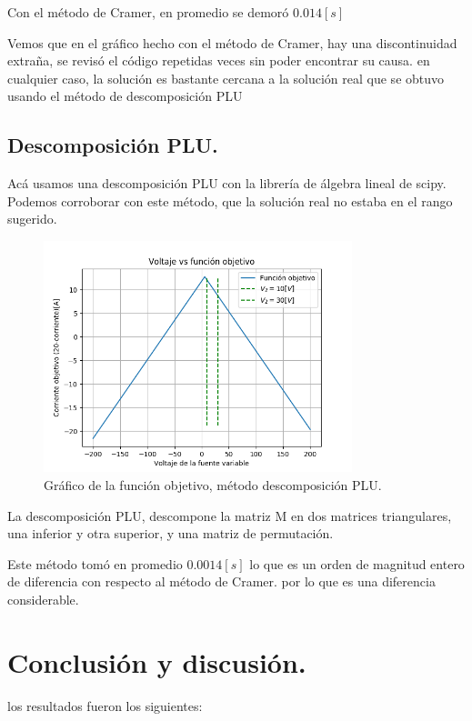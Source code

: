 \documentclass[letter, 11pt]{article}
\begin{document}
Con el método de Cramer, en promedio se demoró $0.014 [s]$

Vemos que en el gráfico hecho con el método de Cramer, hay una discontinuidad extraña, se revisó el código repetidas veces sin poder encontrar su causa. en cualquier caso, la solución es bastante cercana a la solución real que se obtuvo usando el método de descomposición PLU

\subsection{Descomposición PLU.}

Acá usamos una descomposición PLU con la librería de álgebra lineal de scipy. Podemos corroborar con este método, que la solución real no estaba en el rango sugerido.

\begin{figure}[h]
 \centering
 \includegraphics[width=0.8\textwidth]{./img2.png}
 \caption{Gráfico de la función objetivo, método descomposición PLU.}
\end{figure}


La descomposición PLU, descompone la matriz M en dos matrices triangulares, una inferior y otra superior, y una matriz de permutación.

Este método tomó en promedio $0.0014 [s]$ lo que es un orden de magnitud entero de diferencia con respecto al método de Cramer. por lo que es una diferencia considerable.


\section{Conclusión y discusión.}

los resultados fueron los siguientes:
\end{document}

